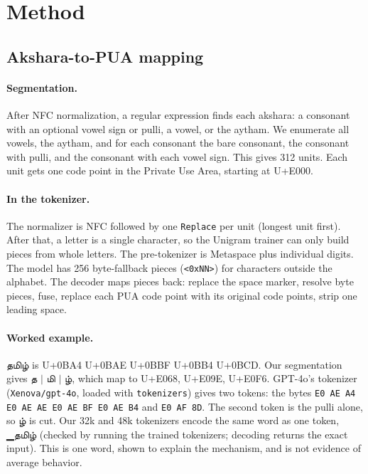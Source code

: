 \documentclass[11pt]{article}
\newcommand{\ta}[1]{{\tamilfont #1}}
\begin{document}
\section{Method}
\label{sec:method}

\subsection{Akshara-to-PUA mapping}
\label{sec:pua}
\paragraph{Segmentation.}
After NFC normalization, a regular expression finds each akshara: a consonant with an optional vowel sign or pulli, a vowel, or the aytham.
We enumerate all vowels, the aytham, and for each consonant the bare consonant, the consonant with pulli, and the consonant with each vowel sign.
This gives 312 units.
Each unit gets one code point in the Private Use Area, starting at U+E000.

\paragraph{In the tokenizer.}
The normalizer is NFC followed by one \texttt{Replace} per unit (longest unit first).
After that, a letter is a single character, so the Unigram trainer can only build pieces from whole letters.
The pre-tokenizer is Metaspace plus individual digits.
The model has 256 byte-fallback pieces (\texttt{<0xNN>}) for characters outside the alphabet.
The decoder maps pieces back: replace the space marker, resolve byte pieces, fuse, replace each PUA code point with its original code points, strip one leading space.

\paragraph{Worked example.}
\ta{தமிழ்} is U+0BA4 U+0BAE U+0BBF U+0BB4 U+0BCD.
Our segmentation gives \ta{த} $|$ \ta{மி} $|$ \ta{ழ்}, which map to U+E068, U+E09E, U+E0F6.
GPT-4o's tokenizer (\texttt{Xenova/gpt-4o}, loaded with \texttt{tokenizers}) gives two tokens: the bytes \texttt{E0 AE A4 E0 AE AE E0 AE BF E0 AE B4} and \texttt{E0 AF 8D}.
The second token is the pulli alone, so \ta{ழ்} is cut.
Our 32k and 48k tokenizers encode the same word as one token, \ta{▁தமிழ்} (checked by running the trained tokenizers; decoding returns the exact input).
This is one word, shown to explain the mechanism, and is not evidence of average behavior.
\end{document}
